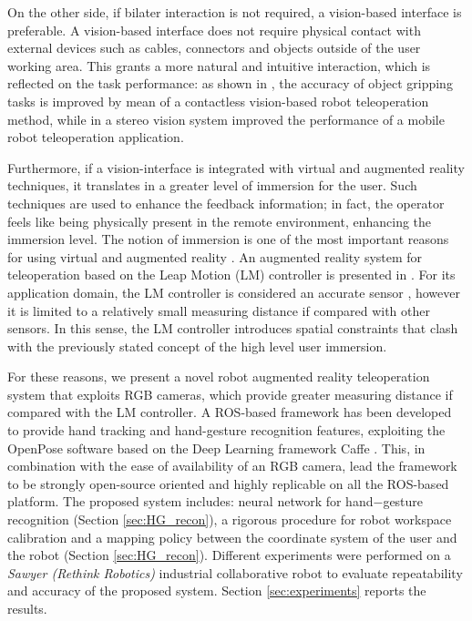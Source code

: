 \documentclass[letterpaper, 10 pt, conference]{ieeeconf}  %
\begin{document}
On the other side, if bilater interaction is not required, a vision-based interface is preferable. A vision-based interface does not require physical contact with external devices such as cables, connectors and objects outside of the user working area. This grants a more natural and intuitive interaction, which is reflected on the task performance: as shown in \cite{Kofman2005}, the accuracy of object gripping tasks is improved by mean of a contactless vision-based robot teleoperation method, while in \cite{Livatino2009} a stereo vision system improved the performance of a mobile robot teleoperation application.

Furthermore, if a vision-interface is integrated with virtual and augmented reality techniques, it translates in a greater level of immersion for the user. Such techniques are used to enhance the feedback information; in fact, the operator feels like being physically present in the remote environment, enhancing the immersion level. The notion of immersion is one of the most important reasons for using virtual and augmented reality \cite{Boboc2012}. An augmented reality system for teleoperation based on the Leap Motion (LM) controller is presented in \cite{Peppoloni2015}. For its application domain, the LM controller is considered an accurate sensor \cite{Hedayati2018}, however it is limited to a relatively small measuring distance if compared with other sensors. In this sense, the LM controller introduces spatial constraints that clash with the previously stated concept of the high level user immersion.

For these reasons, we present a novel robot augmented reality teleoperation system that exploits RGB cameras, which provide greater measuring distance if compared with the LM controller. A ROS-based framework has been developed to provide hand tracking and hand-gesture recognition features, exploiting the OpenPose software \cite{simon2017hand, cao2018openpose} based on the Deep Learning framework Caffe \cite{jia2014caffe}.
This, in combination with the ease of availability of an RGB camera, lead the framework to be strongly open-source oriented and highly replicable on all the ROS-based platform. The proposed system includes: neural network for hand$-$gesture recognition (Section \ref{sec:HG_recon}), a rigorous procedure for robot workspace calibration and a mapping policy between the coordinate system of the user and the robot (Section \ref{sec:HG_recon}). 
Different experiments were performed on a \textit{Sawyer (Rethink Robotics)} industrial collaborative robot to evaluate repeatability and accuracy of the proposed system. Section \ref{sec:experiments} reports the results.
\end{document}
